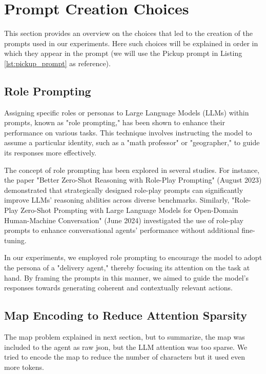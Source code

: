 \section{Prompt Creation Choices}
\label{sec:prompt_creation_choices}

This section provides an overview on the choices that led to the creation of the
prompts used in our experiments. Here such choices will be explained in order in
which they appear in the prompt (we will use the Pickup prompt in Listing \ref{lst:pickup_prompt}
as reference).

\subsection{Role Prompting}
Assigning specific roles or personas to Large Language Models (LLMs) within
prompts, known as "role prompting," has been shown to enhance their performance
on various tasks. This technique involves instructing the model to assume a particular
identity, such as a "math professor" or "geographer," to guide its responses more
effectively.

The concept of role prompting has been explored in several studies. For instance,
the paper "Better Zero-Shot Reasoning with Role-Play Prompting" (August 2023) demonstrated
that strategically designed role-play prompts can significantly improve LLMs'
reasoning abilities across diverse benchmarks. Similarly, "Role-Play Zero-Shot Prompting
with Large Language Models for Open-Domain Human-Machine Conversation" (June 2024)
investigated the use of role-play prompts to enhance conversational agents' performance
without additional fine-tuning.

In our experiments, we employed role prompting to encourage the model to adopt
the persona of a "delivery agent," thereby focusing its attention on the task at
hand. By framing the prompts in this manner, we aimed to guide the model's responses
towards generating coherent and contextually relevant actions.

\subsection{Map Encoding to Reduce Attention Sparsity}

The map problem explained in next section, but to summarize, the map was
included to the agent as raw json, but the LLM attention was too sparse. We
tried to encode the map to reduce the number of characters but it used even more
tokens.


